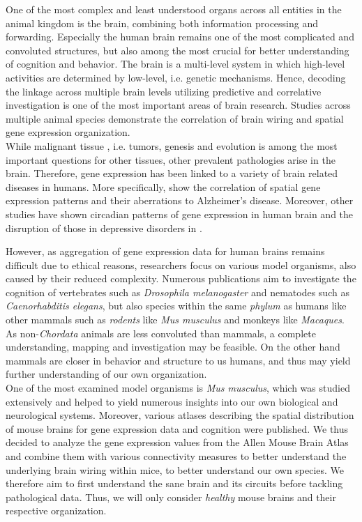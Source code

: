 \documentclass[]{article}
\begin{document}
One of the most complex and least understood organs across all entities in the animal kingdom is the brain, combining both information processing and forwarding. Especially the human brain remains one of the most complicated and convoluted structures, but also among the most crucial for better understanding of cognition and behavior. 
The brain is a multi-level system in which high-level activities are determined by low-level, i.e. genetic mechanisms. Hence, decoding the linkage across multiple brain levels utilizing predictive and correlative investigation is one of the most important areas of brain research. Studies across multiple animal species demonstrate the correlation of brain wiring and spatial gene expression organization.\\

While malignant tissue , i.e. tumors, genesis and evolution is among the most important questions for other tissues, other prevalent pathologies arise in the brain. Therefore, gene expression has been linked to a variety of brain related diseases in humans. More specifically, \citet{twine2011whole} show the correlation of spatial gene expression patterns and their aberrations to Alzheimer's disease. Moreover, other studies have shown circadian patterns of gene expression in human brain and the disruption of those in depressive disorders in \citet{li2013circadian}. 

However, as aggregation of gene expression data for human brains remains difficult due to ethical reasons, researchers focus on various model organisms, also caused by their reduced complexity. Numerous publications aim to investigate the cognition of vertebrates such as \textit{Drosophila melanogaster} and nematodes such as \textit{Caenorhabditis elegans}, but also species within the same \textit{phylum} as humans like other mammals such as \textit{rodents} like \textit{Mus musculus} and monkeys like \textit{Macaques}. As non-\textit{Chordata} animals are less convoluted than mammals, a complete understanding, mapping and investigation may be feasible. On the other hand mammals are closer in behavior and structure to us humans, and thus may yield further understanding of our own organization. \\
One of the most examined model organisms is \textit{Mus musculus}, which was studied extensively and helped to yield numerous insights into our own biological and neurological systems. Moreover, various atlases describing the spatial distribution of mouse brains for gene expression data and cognition were published. We thus decided to analyze the gene expression values from the Allen Mouse Brain Atlas and combine them with various connectivity measures to better understand the underlying brain wiring within mice, to better understand our own species. We therefore aim to first understand the sane brain and its circuits before tackling pathological data. Thus, we will only consider \textit{healthy} mouse brains and their respective organization.\\
\end{document}
